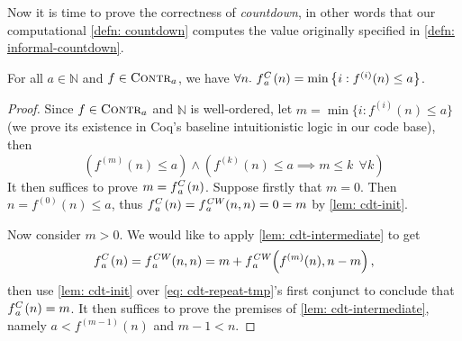 Now it is time to prove the correctness of \emph{countdown}, in other words that our computational \cref{defn: countdown} computes the value originally specified in \cref{defn: informal-countdown}.
\begin{thm} \label{thm: cdt-repeat}
	For all $a\in \mathbb{N}$ and $f\in \text{\scshape{Contr}}_{a}$, we have 
$	\forall n.~ \cdt{f}{a}(n) = \min\left\{ i : f^{(i)}(n) \le a \right\} $.
\end{thm}
\begin{proof}
Since $f\in \text{\scshape{Contr}}_{a}$ and $\mathbb{N}$ is well-ordered, let $m = \min\big\{i : f^{(i)}(n)\le a\big\}$ (we prove its existence in Coq's baseline intuitionistic logic in our code base), then
	\begin{equation}
	\left(f^{(m)}(n) \le a\right) \label{eq: cdt-repeat-tmp} \wedge
	 \left(f^{(k)}(n)\le a \implies m \le k \ \ \forall k\right)
	\end{equation}
	It then suffices to prove $m = \cdt{f}{a}(n)$. Suppose firstly that $m = 0$. Then $n = f^{(0)}(n)\le a$, thus $\cdt{f}{a}(n) = \cdw{f}{a}(n, n) = 0 = m$ by \cref{lem: cdt-init}.
	
	Now consider $m > 0$. We would like to apply \cref{lem: cdt-intermediate} to get
	\begin{equation*}
	\cdt{f}{a}(n) = \cdw{f}{a}(n, n) = m + \cdw{f}{a}\left(f^{(m)}(n), n-m\right),
	\end{equation*}
	then use \cref{lem: cdt-init} over \eqref{eq: cdt-repeat-tmp}'s first conjunct to conclude that $\cdt{f}{a}(n) = m$. It then suffices to prove the premises of \cref{lem: cdt-intermediate}, namely $a < f^{(m-1)}(n)$ and $m-1 < n$.
	

\end{proof}
